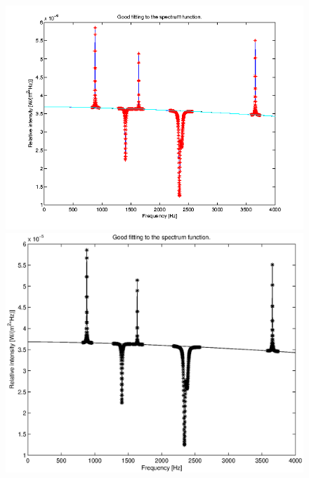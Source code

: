 \documentclass[10pt, a4paper]{article}
\begin{document}
\begin{figure}[hbt]
\begin{center}
\ifpdf
	\includegraphics[width=\linewidth]{../img/spectrum_goodfit.png}
\else
	\includegraphics[width=\linewidth]{../img/spectrum_goodfit.eps}
\fi
\end{center}
\caption{}
\label{fig:goodfit}
\end{figure}
\end{document}

